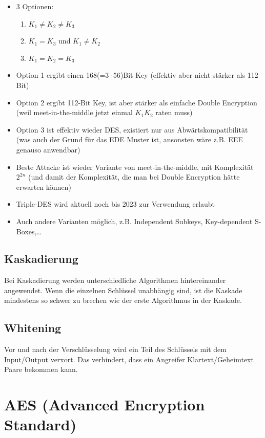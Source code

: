 \begin{itemize}
    \item 3 Optionen:
    \begin{enumerate}
        \item $K_1 \neq K_2 \neq K_3$
        \item $K_1 = K_3$ und $K_1 \neq K_2$
        \item $K_1 = K_2 = K_3$
    \end{enumerate}
    \item Option 1 ergibt einen 168(=$3\cdot 56$)Bit Key (effektiv aber nicht stärker als 112 Bit)
    \item Option 2 ergibt 112-Bit Key, ist aber stärker als einfache Double Encryption (weil meet-in-the-middle jetzt einmal $K_1K_2$ raten muss)
    \item Option 3 ist effektiv wieder DES, existiert nur aus Abwärtskompatibilität (was auch der Grund für das EDE Muster ist, ansonsten wäre z.B. EEE genauso anwendbar)
    \item Beste Attacke ist wieder Variante von meet-in-the-middle, mit Komplexität $2^{2n}$ (und damit der Komplexität, die man bei Double Encryption hätte erwarten 
    können)
    \item Triple-DES wird aktuell noch bis 2023 zur Verwendung erlaubt
    \item Auch andere Varianten möglich, z.B. Independent Subkeys, Key-dependent S-Boxes,\ldots
\end{itemize}

\subsection{Kaskadierung}

Bei Kaskadierung werden unterschiedliche Algorithmen hintereinander angewendet. Wenn die einzelnen Schlüssel unabhängig sind, ist die Kaskade mindestens so schwer zu 
brechen wie der erste Algorithmus in der Kaskade.

\subsection{Whitening}

Vor und nach der Verschlüsselung wird ein Teil des Schlüssels mit dem Input/Output verxort. Das verhindert, dass ein Angreifer Klartext/Geheimtext Paare bekommen kann.

\section{AES (Advanced Encryption Standard)}

